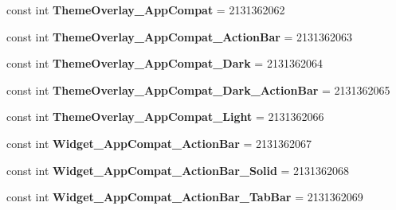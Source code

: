 \begin{DoxyCompactItemize}
const int {\bfseries Theme\+Overlay\+\_\+\+App\+Compat} = 2131362062
\item 
\mbox{\label{class_pinned_app_1_1_droid_1_1_resource_1_1_style_a7d023a8e253bab0d365ad6a8f6555a1d}} 
const int {\bfseries Theme\+Overlay\+\_\+\+App\+Compat\+\_\+\+Action\+Bar} = 2131362063
\item 
\mbox{\label{class_pinned_app_1_1_droid_1_1_resource_1_1_style_a34581d4c2fd47186d2f2cb73006c6061}} 
const int {\bfseries Theme\+Overlay\+\_\+\+App\+Compat\+\_\+\+Dark} = 2131362064
\item 
\mbox{\label{class_pinned_app_1_1_droid_1_1_resource_1_1_style_a82fb821352a41c1c5c40f51fde5096c1}} 
const int {\bfseries Theme\+Overlay\+\_\+\+App\+Compat\+\_\+\+Dark\+\_\+\+Action\+Bar} = 2131362065
\item 
\mbox{\label{class_pinned_app_1_1_droid_1_1_resource_1_1_style_abd13b3526daabf216da111b49cdf81f1}} 
const int {\bfseries Theme\+Overlay\+\_\+\+App\+Compat\+\_\+\+Light} = 2131362066
\item 
\mbox{\label{class_pinned_app_1_1_droid_1_1_resource_1_1_style_a27e7794d24b6ed4b487b208870340d8d}} 
const int {\bfseries Widget\+\_\+\+App\+Compat\+\_\+\+Action\+Bar} = 2131362067
\item 
\mbox{\label{class_pinned_app_1_1_droid_1_1_resource_1_1_style_abc5fae9e190c109aae9aae1c0deffdf6}} 
const int {\bfseries Widget\+\_\+\+App\+Compat\+\_\+\+Action\+Bar\+\_\+\+Solid} = 2131362068
\item 
\mbox{\label{class_pinned_app_1_1_droid_1_1_resource_1_1_style_a8142400a0de1f39236b7e40d3445d6de}} 
const int {\bfseries Widget\+\_\+\+App\+Compat\+\_\+\+Action\+Bar\+\_\+\+Tab\+Bar} = 2131362069
\item 
\mbox{\label{class_pinned_app_1_1_droid_1_1_resource_1_1_style_a171db63da15c67678e32d222c597b122}} 

\end{DoxyCompactItemize}
